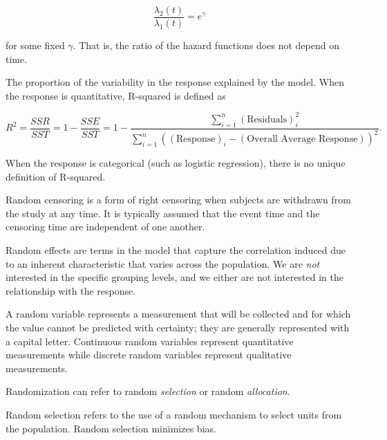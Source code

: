 \documentclass[
  letterpaper,
  DIV=11,
  numbers=noendperiod]{scrreprt}
\providecommand{\tightlist}{%
  \setlength{\itemsep}{0pt}\setlength{\parskip}{0pt}}\usepackage{longtable,booktabs,array}
\theoremstyle{definition}
\theoremstyle{definition}
\theoremstyle{remark}
\begin{document}
\[\frac{\lambda_2(t)}{\lambda_1(t)} = e^{\gamma}\]

for some fixed \(\gamma\). That is, the ratio of the hazard functions
does not depend on time.

\begin{description}
\tightlist
\item[R-squared (Definition~\ref{def-r-squared})]
The proportion of the variability in the response explained by the
model. When the response is quantitative, R-squared is defined as
\end{description}

\[R^2 = \frac{SSR}{SST} = 1 - \frac{SSE}{SST} = 1 - \frac{\sum_{i=1}^{n} (\text{Residuals})_i^2}{\sum_{i=1}^{n} \left((\text{Response})_i - (\text{Overall Average Response})\right)^2}.\]

When the response is categorical (such as logistic regression), there is
no unique definition of R-squared.

\begin{description}
\tightlist
\item[Random Censoring (Definition~\ref{def-random-censoring})]
Random censoring is a form of right censoring when subjects are
withdrawn from the study at any time. It is typically assumed that the
event time and the censoring time are independent of one another.
\item[Random Effect (Definition~\ref{def-random-effect})]
Random effects are terms in the model that capture the correlation
induced due to an inherent characteristic that varies across the
population. We are \emph{not} interested in the specific grouping
levels, and we either are not interested in the relationship with the
response.
\item[Random Variable (Definition~\ref{def-random-variable})]
A random variable represents a measurement that will be collected and
for which the value cannot be predicted with certainty; they are
generally represented with a capital letter. Continuous random variables
represent quantitative measurements while discrete random variables
represent qualitative measurements.
\item[Randomization (Definition~\ref{def-randomization})]
Randomization can refer to random \emph{selection} or random
\emph{allocation}.
\end{description}

Random selection refers to the use of a random mechanism to select units
from the population. Random selection minimizes bias.
\end{document}
